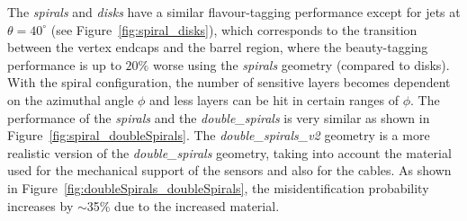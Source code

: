 The \emph{spirals} and \emph{disks} have a similar flavour-tagging
performance except for jets at $\theta=40^{\circ}$ (see
Figure~\ref{fig:spiral_disks}), which corresponds to the transition
between the vertex endcaps and the barrel region, where the
beauty-tagging performance is up to $20\%$ worse using the
\emph{spirals} geometry (compared to disks). With the spiral
configuration, the number of sensitive layers becomes dependent on the
azimuthal angle $\phi$ and less layers can be hit in certain ranges of
$\phi$. The performance of the \emph{spirals} and the
\emph{double\_spirals} is very similar as shown in
Figure~\ref{fig:spiral_doubleSpirals}.  The \emph{double\_spirals\_v2}
geometry is a more realistic version of the \emph{double\_spirals}
geometry, taking into account the material used for the mechanical
support of the sensors and also for the cables. As shown in
Figure~\ref{fig:doubleSpirals_doubleSpirals}, the misidentification
probability increases by $\sim$35\% due to the increased material.


